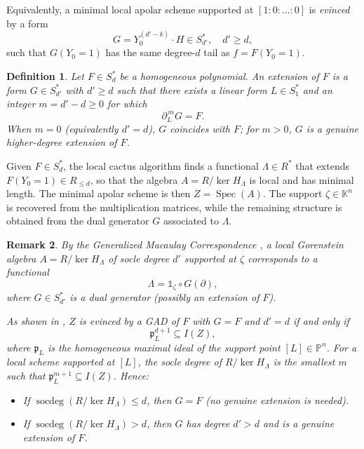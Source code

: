 \documentclass[a4paper,11p]{amsart}
\newtheorem{defn0}{Definition}[section]
\newtheorem{remark0}[defn0]{Remark}
\newenvironment{definition}{ \begin{defn0}}{\end{defn0}}
\newenvironment{remark}{ \begin{remark0}\rm}{\end{remark0}}
\newcommand{\K}{\mathbb K}
\begin{document}



Equivalently, a minimal local apolar scheme supported at $[1:0:\dots:0]$ is \emph{evinced} by a form 
\[
G = Y_0^{(d'-k)} \cdot H \in S_{d'}^*, \quad d' \ge d,
\]
such that $G(Y_0=1)$ has the same degree-$d$ tail as $f=F(Y_0=1)$.

\begin{definition}\label{def:extension}
Let $F \in S_d^*$ be a homogeneous polynomial.  
An \emph{extension} of $F$ is a form $G \in S_{d'}^*$ with $d' \ge d$ such that there exists a linear form $L \in S_1^*$ and an integer $m = d' - d \ge 0$ for which 
\[
\partial_L^{\,m} G = F.
\]
When $m=0$ (equivalently $d'=d$), $G$ coincides with $F$; for $m>0$, $G$ is a genuine higher-degree extension of $F$.
\end{definition}
Given $F\in S_d^*$, the local cactus algorithm finds a functional $\Lambda\in R^*$ that extends $F(Y_0=1)\in R_{\leq d}$, so that the algebra $A=R/\ker H_\Lambda$ is local and has minimal length. The minimal apolar scheme is then $Z=\operatorname{Spec}(A)$. The support $\zeta\in \K^n$ is recovered from the multiplication matrices, while the remaining structure is obtained from the dual generator $G$ associated to $\Lambda$.


\begin{remark}
By the Generalized Macaulay Correspondence , a local Gorenstein algebra $A = R/\ker H_\Lambda$ of socle degree $d'$ supported at $\zeta$ corresponds to a functional 
\[
\Lambda = \mathds{1}_\zeta \circ G(\partial),
\]
where $G \in S_{d'}^*$ is a dual generator (possibly an extension of $F$).

As shown in \cite[Proposition~4.3]{GAD}, $Z$ is evinced by a GAD of $F$ with $G=F$ and $d'=d$ if and only if
\[
\mathfrak{p}_L^{d+1} \subseteq I(Z),
\]
where $\mathfrak{p}_L$ is the homogeneous maximal ideal of the support point $[L] \in \mathbb{P}^n$. For a local scheme supported at $[L]$, the socle degree of $R/\ker H_\Lambda$ is the smallest $m$ such that $\mathfrak{p}_L^{m+1} \subseteq I(Z)$. Hence:
\begin{itemize}
    \item If $\operatorname{socdeg}(R/\ker H_\Lambda) \le d$, then $G=F$ (no genuine extension is needed).  
    \item If $\operatorname{socdeg}(R/\ker H_\Lambda) > d$, then $G$ has degree $d'>d$ and is a genuine extension of $F$.
\end{itemize}
\end{remark}
\end{document}
